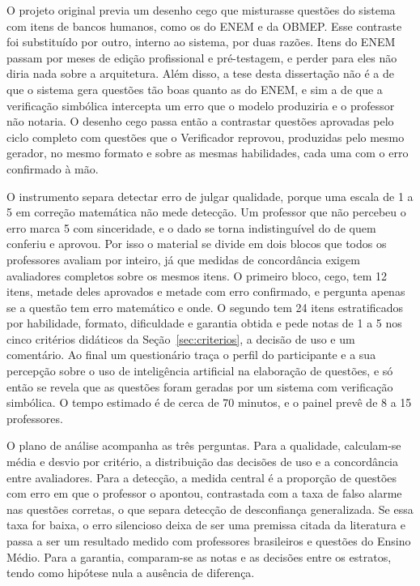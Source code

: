 O projeto original previa um desenho cego que misturasse questões do sistema com itens de bancos
humanos, como os do ENEM e da OBMEP. Esse contraste foi substituído por outro, interno ao sistema,
por duas razões. Itens do ENEM passam por meses de edição profissional e pré-testagem, e perder para
eles não diria nada sobre a arquitetura. Além disso, a tese desta dissertação não é a de que o
sistema gera questões tão boas quanto as do ENEM, e sim a de que a verificação simbólica intercepta um
erro que o modelo produziria e o professor não notaria. O desenho cego passa então a contrastar
questões aprovadas pelo ciclo completo com questões que o Verificador reprovou, produzidas pelo mesmo
gerador, no mesmo formato e sobre as mesmas habilidades, cada uma com o erro confirmado à mão.

O instrumento separa detectar erro de julgar qualidade, porque uma escala de 1 a 5 em correção
matemática não mede detecção. Um professor que não percebeu o erro marca 5 com sinceridade, e o dado
se torna indistinguível do de quem conferiu e aprovou. Por isso o material se divide em dois blocos
que todos os professores avaliam por inteiro, já que medidas de concordância exigem avaliadores
completos sobre os mesmos itens. O primeiro bloco, cego, tem 12 itens, metade deles aprovados e
metade com erro confirmado, e pergunta apenas se a questão tem erro matemático e onde. O segundo tem
24 itens estratificados por habilidade, formato, dificuldade e garantia obtida e pede notas de 1 a 5
nos cinco critérios didáticos da Seção~\ref{sec:criterios}, a decisão de uso e um comentário. Ao
final um questionário traça o perfil do participante e a sua percepção sobre o uso de inteligência
artificial na elaboração de questões, e só então se revela que as questões foram geradas por um
sistema com verificação simbólica. O tempo estimado é de cerca de 70 minutos, e o painel prevê de 8 a
15 professores.

O plano de análise acompanha as três perguntas. Para a qualidade, calculam-se média e desvio por
critério, a distribuição das decisões de uso e a concordância entre avaliadores. Para a detecção, a
medida central é a proporção de questões com erro em que o professor o apontou, contrastada com a taxa
de falso alarme nas questões corretas, o que separa detecção de desconfiança generalizada. Se essa
taxa for baixa, o erro silencioso deixa de ser uma premissa citada da literatura e passa a ser um
resultado medido com professores brasileiros e questões do Ensino Médio. Para a garantia, comparam-se
as notas e as decisões entre os estratos, tendo como hipótese nula a ausência de diferença.

